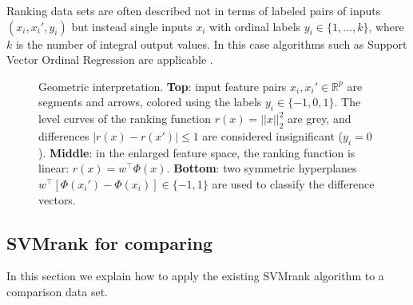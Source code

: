 \documentclass{article}
\newcommand{\RR}{\mathbb R}
\begin{document}
Ranking data sets are often described not in terms of labeled pairs of
inputs $(x_i, x_i', y_i)$ but instead single inputs $x_i$ with ordinal
labels $y_i\in\{1,\dots,k\}$, where $k$ is the number of integral
output values. In this case algorithms such as Support Vector Ordinal
Regression are applicable \citep{ordinal}.




\begin{figure}
  \centering
  
  \vskip -0.5cm
  \caption{Geometric interpretation. \textbf{Top}: input feature pairs
    $x_i,x_i'\in\RR^p$ are segments and arrows, colored using the
    labels $y_i\in\{-1,0,1\}$. The level curves of the ranking
    function $r(x)=||x||_2^2$ are grey, and differences
    $|r(x)-r(x')|\leq 1$ are considered insignificant
    ($y_i=0$). \textbf{Middle}: in the enlarged feature space, the
    ranking function is linear: $r(x)=w^\intercal
    \Phi(x)$. \textbf{Bottom}: two symmetric hyperplanes
    $w^\intercal[\Phi(x_i')-\Phi(x_i)]\in\{-1,1\}$ are used to
    classify the difference vectors.}
  \label{fig:norm-data}
\end{figure}

\subsection{SVMrank for comparing}
\label{sec:svmrank}
In this section we explain how to apply the existing SVMrank algorithm
to a comparison data set.
\end{document}
